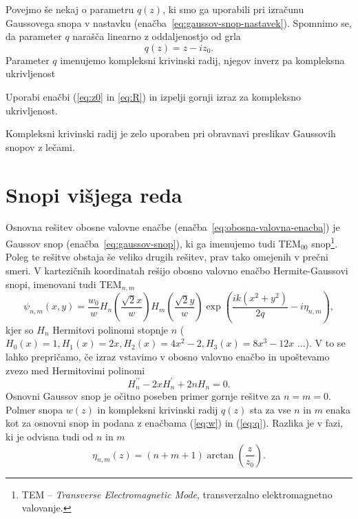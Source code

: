 Povejmo še nekaj o parametru $q(z)$, ki smo ga uporabili pri izračunu Gaussovega snopa v nastavku
(enačba~\ref{eq:gaussov-snop-nastavek}). Spomnimo 
se, da parameter $q$ narašča linearno z oddaljenostjo od grla
\begin{equation}
q(z) = z -iz_0.
\label{eq:q}
\end{equation}
Parameter $q$ imenujemo kompleksni krivinski radij, 
njegov inverz pa kompleksna ukrivljenost
\begin{definition}
Uporabi enačbi (\ref{eq:z0} in \ref{eq:R}) in izpelji gornji izraz za kompleksno ukrivljenost.
\end{definition}
Kompleksni krivinski radij je zelo uporaben pri obravnavi preslikav Gaussovih snopov z lečami.

\section{Snopi višjega reda}
Osnovna rešitev obosne valovne enačbe (enačba~\ref{eq:obosna-valovna-enacba}) 
je Gaussov snop (enačba~\ref{eq:gaussov-snop}), ki ga imenujemo tudi TEM$_{00}$ 
snop\footnote{TEM -- {\it Transverse Electromagnetic Mode}, 
transverzalno elektromagnetno valovanje.}. 
Poleg te rešitve obstaja še veliko drugih rešitev, prav tako omejenih v prečni smeri. 
V kartezičnih koordinatah rešijo obosno valovno enačbo
Hermite-Gaussovi snopi, imenovani tudi TEM$_{n,m}$
\begin{equation}
\psi_{n,m}(x,y)=\frac{w_{0}}{w}H_{n}\left(\frac{\sqrt{2}x}{w}\right)H_{m}\left(\frac{\sqrt{2}y}{w}\right)
\exp\left(\frac{ik(x^{2}+y^{2})}{2q}-i\eta_{n,m}\right),
\label{eq:Gauss-Hermitevi}
\end{equation}
kjer so $H_{n}$ Hermitovi polinomi stopnje $n$ ($H_0(x)=1, H_1(x)=2x, H_2(x)=4x^2-2, H_3(x)=8x^3-12x$ ...). 
V to se lahko
prepričamo, če izraz vstavimo v obosno valovno enačbo
in upoštevamo zvezo med Hermitovimi polinomi 
\begin{equation}
H_{n}^{\prime\prime}-2xH_{n}^{\prime}+2nH_{n}=0.
\end{equation}
Osnovni Gaussov snop je očitno poseben primer gornje rešitve za $n=m=0$.
Polmer snopa $w(z)$ in kompleksni krivinski radij $q(z)$ sta za
vse $n$ in $m$ enaka kot za osnovni snop in podana z enačbama (\ref{eq:w})
in (\ref{eq:q}). Razlika je v fazi, ki je odvisna tudi od $n$ in $m$
\begin{equation}
\eta_{n,m}\left(z\right)=(n+m+1)\arctan\left(\frac{z}{z_{0}}\right).
\end{equation}

